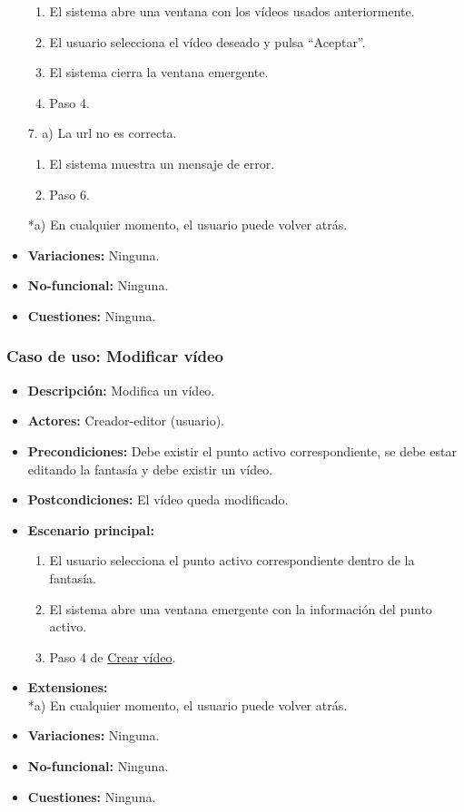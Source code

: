 \begin{itemize}
	\begin{enumerate}
		\item El sistema abre una ventana con los vídeos usados anteriormente.
		\item El usuario selecciona el vídeo deseado y pulsa ``Aceptar''.
		\item El sistema cierra la ventana emergente.
		\item Paso 4.
	\end{enumerate}
	7. a) La url no es correcta.
	\begin{enumerate}
		\item El sistema muestra un mensaje de error.
		\item Paso 6.
	\end{enumerate}
	*a) En cualquier momento, el usuario puede volver atrás.
	\item \textbf{Variaciones:} Ninguna.
	\item \textbf{No-funcional:} Ninguna.
	\item \textbf{Cuestiones:} Ninguna.
\end{itemize}

\subsubsection{Caso de uso: Modificar vídeo}
\begin{itemize}
	\item \textbf{Descripción:} Modifica un vídeo.
	\item \textbf{Actores:} Creador-editor (usuario).
	\item \textbf{Precondiciones:} Debe existir el punto activo correspondiente, se debe estar editando la fantasía y debe existir un vídeo.
	\item \textbf{Postcondiciones:} El vídeo queda modificado.
	\item \textbf{Escenario principal:}
	\begin{enumerate}
		\item El usuario selecciona el punto activo correspondiente dentro de la fantasía.
		\item El sistema abre una ventana emergente con la información del punto activo.
		\item Paso 4 de \hyperlink{crearvideo}{Crear vídeo}.
	\end{enumerate}
	\item \textbf{Extensiones:} \\ *a) En cualquier momento, el usuario puede volver atrás.
	\item \textbf{Variaciones:} Ninguna.
	\item \textbf{No-funcional:} Ninguna.
	\item \textbf{Cuestiones:} Ninguna.
\end{itemize}

